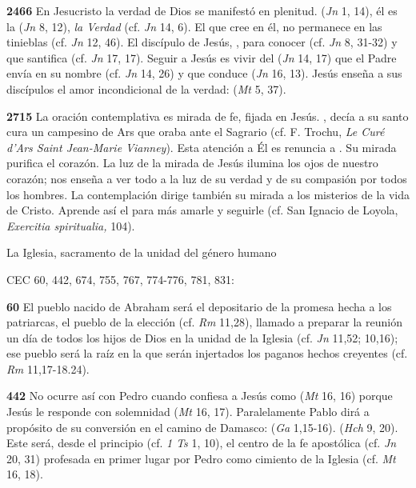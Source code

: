 {\textbf{2466} En Jesucristo la verdad de Dios se manifestó en plenitud.  (\emph{Jn} 1, 14), él es la  (\emph{Jn} 8, 12), \emph{la Verdad} (cf. \emph{Jn} 14, 6). El que cree en él, no permanece en las tinieblas (cf. \emph{Jn} 12, 46). El discípulo de Jesús, , para conocer  (cf. \emph{Jn} 8, 31-32) y que santifica (cf. \emph{Jn} 17, 17). Seguir a Jesús es vivir del  (\emph{Jn} 14, 17) que el Padre envía en su nombre (cf. \emph{Jn} 14, 26) y que conduce  (\emph{Jn} 16, 13). Jesús enseña a sus discípulos el amor incondicional de la verdad:  (\emph{Mt} 5, 37).

\textbf{2715} La oración contemplativa es mirada de fe, fijada en Jesús. , decía a su santo cura un campesino de Ars que oraba ante el Sagrario (cf. F. Trochu, \emph{Le Curé d'Ars Saint Jean-Marie Vianney}). Esta atención a Él es renuncia a . Su mirada purifica el corazón. La luz de la mirada de Jesús ilumina los ojos de nuestro corazón; nos enseña a ver todo a la luz de su verdad y de su compasión por todos los hombres. La contemplación dirige también su mirada a los misterios de la vida de Cristo. Aprende así el  para más amarle y seguirle (cf. San Ignacio de Loyola, \emph{Exercitia spiritualia,} 104).

La Iglesia, sacramento de la unidad del género humano

CEC 60, 442, 674, 755, 767, 774-776, 781, 831:

\textbf{60} El pueblo nacido de Abraham será el depositario de la promesa hecha a los patriarcas, el pueblo de la elección (cf. \emph{Rm} 11,28), llamado a preparar la reunión un día de todos los hijos de Dios en la unidad de la Iglesia (cf. \emph{Jn} 11,52; 10,16); ese pueblo será la raíz en la que serán injertados los paganos hechos creyentes (cf. \emph{Rm} 11,17-18.24).

\textbf{442} No ocurre así con Pedro cuando confiesa a Jesús como  (\emph{Mt} 16, 16) porque Jesús le responde con solemnidad  (\emph{Mt} 16, 17). Paralelamente Pablo dirá a propósito de su conversión en el camino de Damasco:  (\emph{Ga} 1,15-16).  (\emph{Hch} 9, 20). Este será, desde el principio (cf. \emph{1 Ts} 1, 10), el centro de la fe apostólica (cf. \emph{Jn} 20, 31) profesada en primer lugar por Pedro como cimiento de la Iglesia (cf. \emph{Mt} 16, 18).

}
